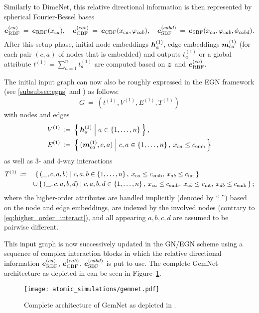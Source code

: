 Similarly to DimeNet, this relative directional information is then represented 
by spherical Fourier-Bessel bases
\[
    \boldsymbol{e}_{\text{RBF}}^{(ca)} \: = \: \boldsymbol{e}_{\text{RBF}}(x_{ca}), 
    \quad \boldsymbol{e}_{\text{CBF}}^{(cab)} \: = \: \boldsymbol{e}_{\text{CBF}}(x_{ca}, \varphi_{cab}),
    \quad \boldsymbol{e}_{\text{SBF}}^{(cabd)} \: = \: \boldsymbol{e}_{\text{SBF}}(x_{ca}, \varphi_{cab}, \phi_{cabd}) 
    \text{.}
\]
After this setup phase, initial node embeddings $\boldsymbol{h}_{a}^{(1)}$, edge embeddings 
$\boldsymbol{m}_{ca}^{(1)}$ (for each pair $(c, a)$ of nodes that is embedded) and outputs
$t_{a}^{(1)}$ or a global attribute $t^{(1)} = \sum_{a=1}^n t_a^{(1)}$
are computed based on $\boldsymbol{z}$ and $\boldsymbol{e}_{\text{RBF}}^{(ca)}$. 

The initial input graph can now also be roughly expressed in the
EGN framework (see \ref{subsubsec:egns} and 
\cite{https://doi.org/10.48550/arxiv.2203.09697}) as follows:
\[
    G \: = \: (t^{(1)}, V^{(1)}, E^{(1)}, T^{(1)})
\]
with nodes and edges
\begin{align*}
    V^{(1)} \: &\coloneqq \: 
    \left\{\, \boldsymbol{h}_{a}^{(1)} \; \middle| \; a \in \left\{1, \dots, n\right\} \,\right\}, \\
    E^{(1)} \: &\coloneqq \: 
    \left\{\, (\boldsymbol{m}_{ca}^{(1)}, c, a) \; \middle| \; c, a \in \left\{1, \dots, n\right\}, \: x_{ca} \leq c_{\text{emb}} \,\right\}
\end{align*}
as well as 3- and 4-way interactions
\begin{align*}
    T^{(1)} \: &\coloneqq \quad 
    \left\{\, (\_, c, a, b) \; \middle| \; c, a, b \in \left\{1, \dots, n\right\}, 
    \: x_{ca} \leq c_{\text{emb}}, \: x_{ab} \leq c_{\text{int}} \,\right\} \\
    &\qquad \cup  \left\{\, (\_, c, a, b, d) \; \middle| \; c, a, b, d \in \left\{1, \dots, n\right\}, 
    \: x_{ca} \leq c_{\text{emb}}, \: x_{ab} \leq c_{\text{int}}, 
    \: x_{db} \leq c_{\text{emb}} \,\right\};
\end{align*}
where the higher-order attributes are handled implicitly (denoted by \enquote{$\_$}) 
based on the node and edge embeddings, are indexed by the involved nodes (contrary 
to \eqref{eq:higher_order_interact}), and all appearing $a, b, c, d$ are assumed to be 
pairwise different.

This input graph is now successively updated in the GN/EGN scheme using a sequence of 
complex interaction blocks in which the relative directional information 
$\boldsymbol{e}_{\text{RBF}}^{(ca)}$, $\boldsymbol{e}_{\text{CBF}}^{(cab)}$, $\boldsymbol{e}_{\text{SBF}}^{(cabd)}$ 
is put to use. The complete GemNet architecture as depicted in 
\cite{https://doi.org/10.48550/arxiv.2106.08903} can be seen in Figure~\ref{fig:gemnet}.

\begin{figure}[H]
    \centering
    \texttt{[image: atomic\_simulations/gemnet.pdf]}
    \caption{Complete architecture of GemNet as depicted in 
    \cite[Appendix F]{https://doi.org/10.48550/arxiv.2106.08903}.}
    \label{fig:gemnet}
\end{figure}
